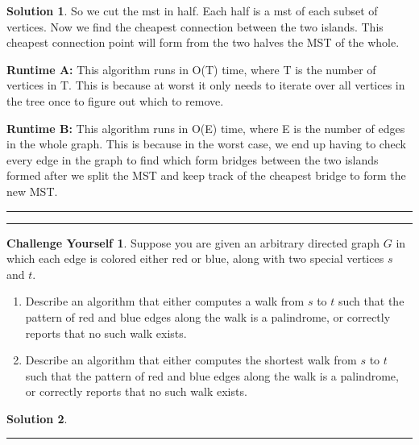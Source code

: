 \documentclass{article}
\theoremstyle{definition}
\newtheorem*{challenge}{Challenge Yourself}
\def\fline{\rule{0.75\linewidth}{0.5pt}}
\newcommand{\finishline}{\begin{center}\fline\end{center}}
\newtheorem*{solution*}{Solution}
\newenvironment{solution}{\begin{solution*}}{{\finishline} \end{solution*}}
\begin{document}
\begin{solution}
    So we cut the mst in half. Each half is a mst of each subset of vertices. Now we find the cheapest connection between the two islands. This cheapest connection point will form from the two halves the MST of the whole. 



    \textbf{Runtime A: }
    This algorithm runs in O(T) time, where T is the number of vertices in T. This is because at worst it only needs to iterate over all vertices in the tree once to figure out which to remove.

    \textbf{Runtime B: }
    This algorithm runs in O(E) time, where E is the number of edges in the whole graph. This is because in the worst case, we end up having to check every edge in the graph to find which form bridges between the two islands formed after we split the MST and keep track of the cheapest bridge to form the new MST.



\end{solution}

\newpage




\finishline

\begin{challenge}
Suppose you are given an arbitrary directed graph $G$ in which each edge is colored either red or blue, along with two special vertices $s$ and $t$.
\begin{enumerate}
    \item[(a)] Describe an algorithm that either computes a walk from $s$ to $t$ such that the pattern of red and blue edges along the walk is a palindrome, or correctly reports that no such walk exists.
\item[(b)] Describe an algorithm that either computes the shortest walk from $s$ to $t$ such that the pattern of red and blue edges along the walk is a palindrome, or correctly reports that no such walk exists.
	\end{enumerate}
\end{challenge}



\begin{solution}













\end{solution}

\newpage
\end{document}
